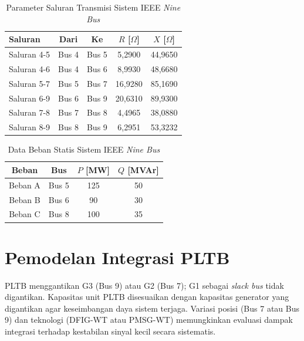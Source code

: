 \begin{table}[H]
  \caption{Parameter Saluran Transmisi Sistem IEEE \textit{Nine Bus}}
  \vspace{0.5em}
  \centering
  \fontsize{12}{14.4}\selectfont
  \setlength{\tabcolsep}{10pt}
  \begin{tabular}{l c c c c}
    \toprule
    \textbf{Saluran} & \textbf{Dari} & \textbf{Ke} & \textbf{$R$ [$\Omega$]} &
    \textbf{$X$ [$\Omega$]} \\
    \midrule
    Saluran 4-5 & Bus 4 & Bus 5 & 5,2900  & 44,9650 \\
    Saluran 4-6 & Bus 4 & Bus 6 & 8,9930  & 48,6680 \\
    Saluran 5-7 & Bus 5 & Bus 7 & 16,9280 & 85,1690 \\
    Saluran 6-9 & Bus 6 & Bus 9 & 20,6310 & 89,9300 \\
    Saluran 7-8 & Bus 7 & Bus 8 & 4,4965  & 38,0880 \\
    Saluran 8-9 & Bus 8 & Bus 9 & 6,2951  & 53,3232 \\
    \bottomrule
  \end{tabular}
  \label{tab:saluran_params}
\end{table}

\begin{table}[H]
  \caption{Data Beban Statis Sistem IEEE \textit{Nine Bus}}
  \vspace{0.5em}
  \centering
  \fontsize{12}{14.4}\selectfont
  \setlength{\tabcolsep}{12pt}
  \begin{tabular}{c c c c}
    \toprule
    \textbf{Beban} & \textbf{Bus} & \textbf{$P$ [MW]} & \textbf{$Q$ [MVAr]} \\
    \midrule
    Beban A & Bus 5 & 125 & 50 \\
    Beban B & Bus 6 & 90  & 30 \\
    Beban C & Bus 8 & 100 & 35 \\
    \bottomrule
  \end{tabular}
  \label{tab:beban_params}
\end{table}


\section{Pemodelan Integrasi PLTB}

PLTB menggantikan G3 (Bus 9) atau G2 (Bus 7); G1 sebagai \textit{slack bus} tidak digantikan. Kapasitas unit PLTB
disesuaikan dengan kapasitas generator yang digantikan agar keseimbangan daya
sistem terjaga. Variasi posisi (Bus 7 atau Bus 9) dan teknologi (DFIG-WT atau
PMSG-WT) memungkinkan evaluasi dampak integrasi terhadap kestabilan sinyal kecil
secara sistematis.

